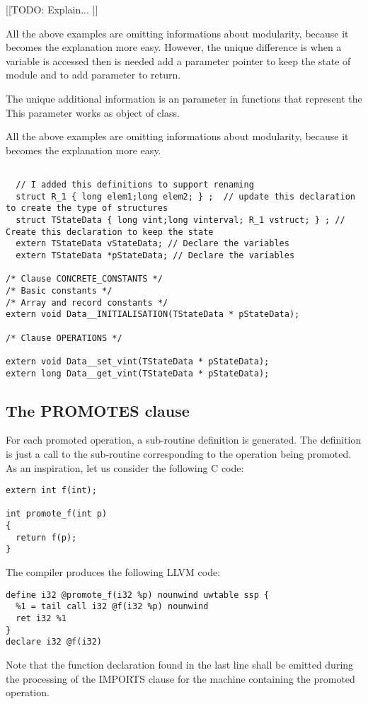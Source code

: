 \documentclass{article}
\begin{document}
[[TODO: Explain... ]]

All the above examples are omitting informations about modularity,
because it becomes the explanation more easy. However, the unique difference
is when a variable is accessed then is needed add a parameter pointer to keep the state of module
and to add parameter  to return.




The unique additional information is an parameter in functions that represent the 
This parameter works as object of class.

All the above examples are omitting informations about modularity,
because it becomes the explanation more easy.

 

\begin{verbatim}
	
  // I added this definitions to support renaming
  struct R_1 { long elem1;long elem2; } ;  // update this declaration to create the type of structures
  struct TStateData { long vint;long vinterval; R_1 vstruct; } ; // Create this declaration to keep the state
  extern TStateData vStateData; // Declare the variables
  extern TStateData *pStateData; // Declare the variables

/* Clause CONCRETE_CONSTANTS */
/* Basic constants */
/* Array and record constants */
extern void Data__INITIALISATION(TStateData * pStateData);

/* Clause OPERATIONS */

extern void Data__set_vint(TStateData * pStateData);
extern long Data__get_vint(TStateData * pStateData);
\end{verbatim}




\subsection{The PROMOTES clause}

For each promoted operation, a sub-routine definition is generated.
The definition is just a call to the sub-routine corresponding to
the operation being promoted. As an inspiration, let us consider
the following C code:
\begin{verbatim}
extern int f(int);

int promote_f(int p)
{
  return f(p);
}
\end{verbatim}
The compiler produces the following LLVM code:
\begin{verbatim}
define i32 @promote_f(i32 %p) nounwind uwtable ssp {
  %1 = tail call i32 @f(i32 %p) nounwind
  ret i32 %1
}
declare i32 @f(i32)
\end{verbatim}
Note that the function declaration found in the last line shall be
emitted during the processing of the IMPORTS clause for the machine
containing the promoted operation.
\end{document}
